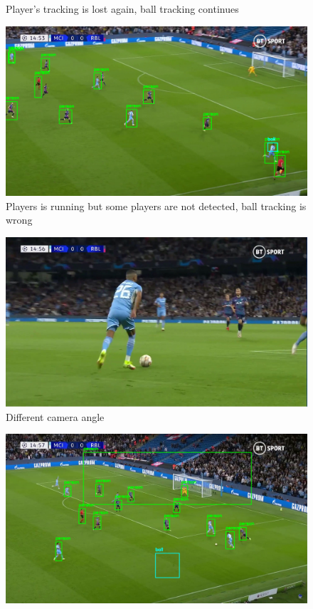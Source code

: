 \documentclass[
    11pt,
    twoside
]{report}
\begin{document}
\begin{appendices}
\begin{figure}[H]
    \caption{Player's tracking is lost again, ball tracking continues}
    \label{img:8}
\end{figure}
\begin{figure}[H]
    \includegraphics[keepaspectratio, width=\columnwidth]{Screenshot_2022-03-03_23-06-18.png}
    \caption{Players is running but some players are not detected, ball tracking is wrong}
    \label{img:9}
\end{figure}
\begin{figure}[H]
    \includegraphics[keepaspectratio, width=\columnwidth]{Screenshot_2022-03-03_21-39-53.png}
    \caption{Different camera angle}
    \label{img:10}
\end{figure}
\begin{figure}[H]
    \includegraphics[keepaspectratio, width=\columnwidth]{Screenshot_2022-03-03_23-06-43.png}

\end{figure}
\end{appendices}
\end{document}
